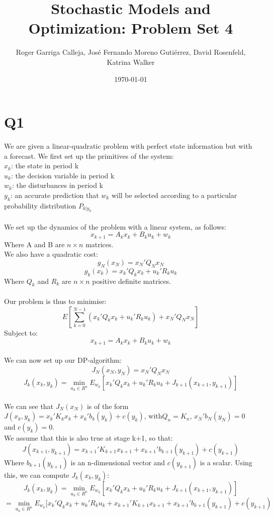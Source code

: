 \documentclass[11pt, english]{article}
\begin{document}
\title{Stochastic Models and Optimization: Problem Set 4}
\author{Roger Garriga Calleja, José Fernando Moreno Gutiérrez, David Rosenfeld, Katrina Walker}
\date{\today}
\maketitle
\section*{Q1}

We are given a linear-quadratic problem with perfect state information but with a forecast. We first set up the primitives of the system:\\
$x_k$: the state in period k\\
$u_k$: the decision variable in period k\\
$w_k$: the disturbances in period k\\
$y_k$: an accurate prediction that $w_k$ will be selected according to a particular probability distribution $P_{k|y_k}$\\
\\
We set up the dynamics of the problem with a linear system, as follows:
$$x_{k+1} = A_kx_k + B_ku_k + w_k$$
Where A and B are $n \times n$ matrices.\\
We also have a quadratic cost:
$$g_N(x_N) = x_N'Q_Nx_N$$
$$g_k(x_k) = x_k'Q_kx_k + u_k'R_ku_k$$
Where $Q_k$ and $R_k$ are $n \times n$ positive definite matrices.\\
\\
Our problem is thus to minimise:
$$E[\sum_{k=0}^{N-1}(x_k'Q_kx_k + u_k'R_ku_k) + x_N'Q_Nx_N]$$
Subject to:
$$x_{k+1} = A_kx_k + B_ku_k + w_k$$
\\
We can now set up our DP-algorithm:
$$J_N(x_N, y_N) = x_N'Q_Nx_N$$
$$J_k(x_k, y_k) = \min_{u_k \in R^n}E_{w_k}[x_k'Q_kx_k + u_k'R_ku_k + J_{k+1}(x_{k+1}, y_{k+1})]$$
\\
We can see that $J_N(x_N)$ is of the form $J(x_k, y_k) = x_k'K_kx_k + x_k'b_k(y_k) + c(y_k)$, with$Q_n = K_n$, $x_N'b_N(y_N) = 0$ and $c(y_k) = 0$.\\
We assume that this is also true at stage k+1, so that:
$$J(x_{k+1}, y_{k+1}) = x_{k+1}'K_{k+1}x_{k+1} + x_{k+1}'b_{k+1}(y_{k+1}) + c(y_{k+1})$$
Where $b_{k+1}(y_{k+1})$ is an n-dimensional vector and $c(y_{k+1})$ is a scalar.
Using this, we can compute $J_k(x_k, y_k)$:
$$J_k(x_k, y_k) = \min_{u_k \in R^n}E_{w_k}[x_k'Q_kx_k + u_k'R_ku_k + J_{k+1}(x_{k+1}, y_{k+1})]$$
$$= \min_{u_k \in R^n}E_{w_k}[x_k'Q_kx_k + u_k'R_ku_k + x_{k+1}'K_{k+1}x_{k+1} + x_{k+1}'b_{k+1}(y_{k+1}) + c(y_{k+1})$$
\end{document}
